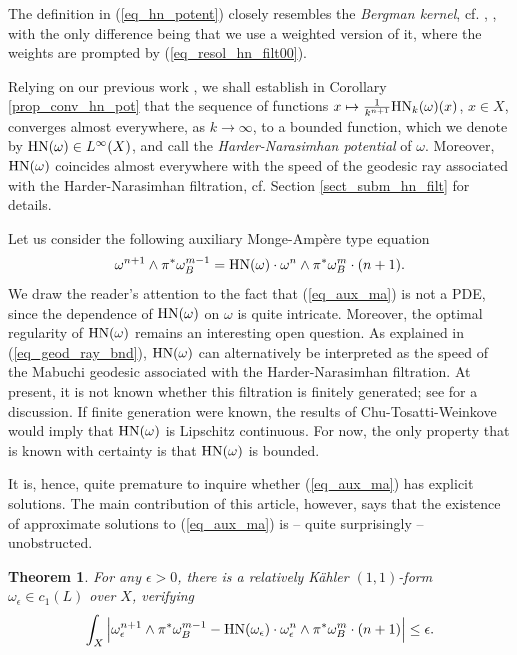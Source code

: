 \documentclass[12pt]{article}
\numberwithin{equation}{section}
\theoremstyle{theorem}
\newtheorem{thm}{Theorem}[section]
\theoremstyle{definition}
\theoremstyle{remark}
\begin{document}
	The definition in (\ref{eq_hn_potent}) closely resembles the \textit{Bergman kernel}, cf. \cite{TianBerg}, \cite{MaHol}, with the only difference being that we use a weighted version of it, where the weights are prompted by (\ref{eq_resol_hn_filt00}).
	\par 
	Relying on our previous work \cite{FinSubmToepl}, we shall establish in Corollary \ref{prop_conv_hn_pot} that the sequence of functions $x \mapsto \frac{1}{k^{n + 1}} {\rm{HN}}_k(\omega)(x)$, $x \in X$, converges almost everywhere, as $k \to \infty$, to a bounded function, which we denote by ${\rm{HN}}(\omega) \in L^{\infty}(X)$, and call the \textit{Harder-Narasimhan potential} of $\omega$.
	Moreover, ${\rm{HN}}(\omega)$ coincides almost everywhere with the speed of the geodesic ray associated with the Harder-Narasimhan filtration, cf. Section \ref{sect_subm_hn_filt} for details.
	\par 
	Let us consider the following auxiliary Monge-Ampère type equation
	\begin{equation}\label{eq_aux_ma}
		\omega^{n + 1} \wedge \pi^* \omega_B^{m - 1}
		=
		{\rm{HN}}(\omega) \cdot \omega^n \wedge \pi^* \omega_B^m \cdot (n + 1).
	\end{equation}
	We draw the reader's attention to the fact that (\ref{eq_aux_ma}) is not a PDE, since the dependence of ${\rm{HN}}(\omega)$ on $\omega$ is quite intricate. 
	Moreover, the optimal regularity of ${\rm{HN}}(\omega)$ remains an interesting open question.
	As explained in (\ref{eq_geod_ray_bnd}), ${\rm{HN}}(\omega)$ can alternatively be interpreted as the speed of the Mabuchi geodesic associated with the Harder-Narasimhan filtration. 
	At present, it is not known whether this filtration is finitely generated; see \cite[\S 7]{FinHNI} for a discussion. 
	If finite generation were known, the results of Chu-Tosatti-Weinkove \cite{ChuTossVeinC11} would imply that ${\rm{HN}}(\omega)$ is Lipschitz continuous. 
	For now, the only property that is known with certainty is that ${\rm{HN}}(\omega)$ is bounded.
	\par 
	It is, hence, quite premature to inquire whether (\ref{eq_aux_ma}) has explicit solutions.
	The main contribution of this article, however, says that the existence of approximate solutions to (\ref{eq_aux_ma}) is -- quite surprisingly -- unobstructed. 
	\begin{thm}\label{thm_main2}
		For any $\epsilon > 0$, there is a relatively Kähler $(1,1)$-form $\omega_{\epsilon} \in c_1(L)$ over $X$, verifying 
		\begin{equation}\label{eq_thm_main2}
			\int_X
			\Big|
			\omega_{\epsilon}^{n + 1} \wedge \pi^* \omega_B^{m - 1}
			-
			{\rm{HN}}(\omega_{\epsilon}) \cdot \omega_{\epsilon}^n \wedge \pi^* \omega_B^m \cdot (n + 1)
			\Big|
			\leq
			\epsilon.
		\end{equation}
	\end{thm}
\end{document}
